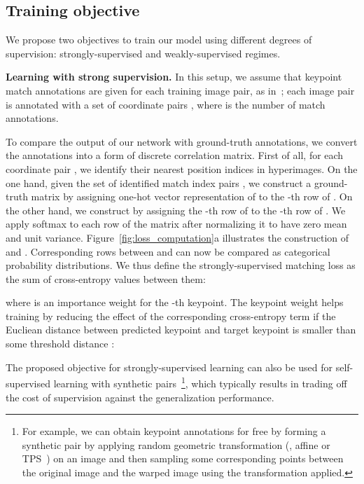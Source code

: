 \documentclass[runningheads]{llncs}
\begin{document}
\subsection{Training objective}
We propose two objectives to train our model using different degrees of supervision: strongly-supervised and weakly-supervised regimes.

\smallbreak
\noindent \textbf{Learning with strong supervision.} 
In this setup, we assume that keypoint match annotations are given for each training image pair, as in~\cite{choy2016universal,han2017scnet,min2019hyperpixel}; each image pair is annotated with a set of coordinate pairs , where  is the number of match annotations.  

To compare the output of our network with ground-truth annotations, we convert the annotations into a form of discrete correlation matrix. 
First of all, for each coordinate pair , we identify their nearest position indices  in hyperimages. 
On the one hand, given the set of identified match index pairs , we construct a ground-truth matrix  by assigning one-hot vector representation of  to the -th row of  . 
On the other hand, we construct  by assigning the -th row of  to the -th row of . 
We apply softmax to each row of the matrix  after normalizing it to have zero mean and unit variance.
Figure~\ref{fig:loss_computation}a illustrates the construction of  and . 
Corresponding rows between  and  can now be compared as categorical probability distributions. 
We thus define the strongly-supervised matching loss as the sum of cross-entropy values between them: 

where  is an importance weight for the -th keypoint. The keypoint weight  helps training by reducing the effect of the corresponding cross-entropy term if the Eucliean distance between predicted keypoint  and target keypoint  is smaller than some threshold distance : 


The proposed objective for strongly-supervised learning can also be used for self-supervised learning with synthetic  pairs~\cite{rocco17geocnn,paul2018attentive}\footnote{For example, we can obtain keypoint annotations for free by forming a synthetic pair by applying random geometric transformation (\eg, affine or TPS~\cite{donato2002approximate}) on an image and then sampling some corresponding points between the original image and the warped image using the transformation applied.}, which typically results in trading off the cost of supervision against the generalization performance.
\end{document}

